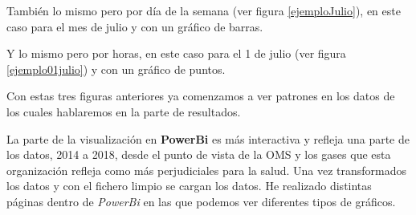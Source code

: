 

También lo mismo pero por día de la semana (ver figura \ref{ejemploJulio}), en este caso para el mes de julio y con un gráfico de barras.



Y lo mismo pero por horas, en este caso para el 1 de julio (ver figura \ref{ejemplo01julio}) y con un gráfico de puntos.

Con estas tres figuras anteriores ya comenzamos a ver patrones en los datos de los cuales hablaremos en la parte de resultados.

La parte de la visualización en \textbf{PowerBi} es más interactiva y refleja una parte de los datos, 2014 a 2018, desde el punto de vista de la OMS y los gases que esta organización refleja como más perjudiciales para la salud.  Una vez transformados los datos y con el fichero limpio se cargan los datos. He realizado distintas páginas dentro de \textit{PowerBi }en las que podemos ver diferentes tipos de gráficos.

